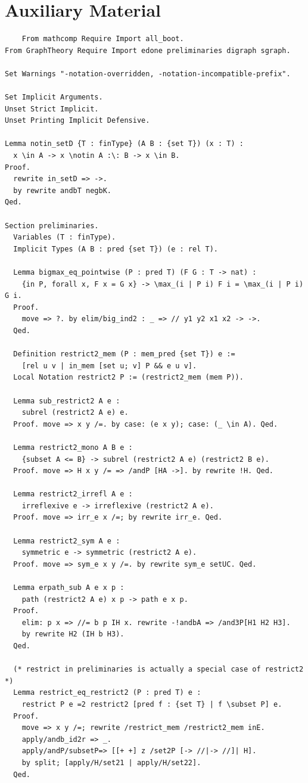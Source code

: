 \section{Auxiliary Material}\label{apdx:aux}
\begin{verbatim}
    From mathcomp Require Import all_boot.
From GraphTheory Require Import edone preliminaries digraph sgraph.

Set Warnings "-notation-overridden, -notation-incompatible-prefix".

Set Implicit Arguments.
Unset Strict Implicit.
Unset Printing Implicit Defensive.

Lemma notin_setD {T : finType} (A B : {set T}) (x : T) :
  x \in A -> x \notin A :\: B -> x \in B.
Proof.
  rewrite in_setD => ->.
  by rewrite andbT negbK.
Qed.

Section preliminaries.
  Variables (T : finType).
  Implicit Types (A B : pred {set T}) (e : rel T).

  Lemma bigmax_eq_pointwise (P : pred T) (F G : T -> nat) :
    {in P, forall x, F x = G x} -> \max_(i | P i) F i = \max_(i | P i) G i.
  Proof.
    move => ?. by elim/big_ind2 : _ => // y1 y2 x1 x2 -> ->.
  Qed.

  Definition restrict2_mem (P : mem_pred {set T}) e := 
    [rel u v | in_mem [set u; v] P && e u v].
  Local Notation restrict2 P := (restrict2_mem (mem P)).

  Lemma sub_restrict2 A e :
    subrel (restrict2 A e) e.
  Proof. move => x y /=. by case: (e x y); case: (_ \in A). Qed.

  Lemma restrict2_mono A B e :
    {subset A <= B} -> subrel (restrict2 A e) (restrict2 B e).
  Proof. move => H x y /= => /andP [HA ->]. by rewrite !H. Qed.

  Lemma restrict2_irrefl A e : 
    irreflexive e -> irreflexive (restrict2 A e).
  Proof. move => irr_e x /=; by rewrite irr_e. Qed.

  Lemma restrict2_sym A e : 
    symmetric e -> symmetric (restrict2 A e).
  Proof. move => sym_e x y /=. by rewrite sym_e setUC. Qed.

  Lemma erpath_sub A e x p : 
    path (restrict2 A e) x p -> path e x p.
  Proof.
    elim: p x => //= b p IH x. rewrite -!andbA => /and3P[H1 H2 H3].
    by rewrite H2 (IH b H3).
  Qed.

  (* restrict in preliminaries is actually a special case of restrict2 *)
  Lemma restrict_eq_restrict2 (P : pred T) e :
    restrict P e =2 restrict2 [pred f : {set T} | f \subset P] e.
  Proof.
    move => x y /=; rewrite /restrict_mem /restrict2_mem inE.
    apply/andb_id2r => _. 
    apply/andP/subsetP=> [[+ +] z /set2P [-> //|-> //]| H].
    by split; [apply/H/set21 | apply/H/set22].
  Qed.


\end{verbatim}
